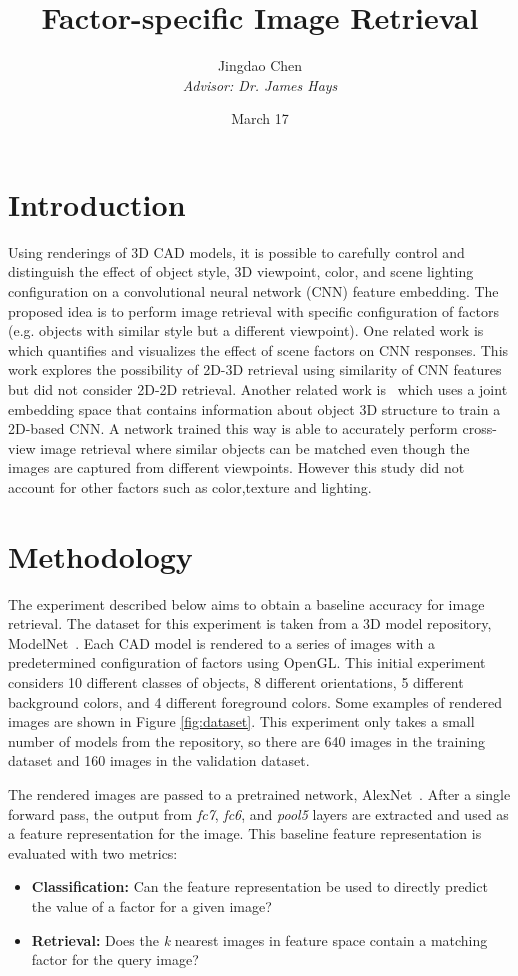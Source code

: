 \documentclass[twoside,10pt]{article}
\begin{document}
\onecolumn
\title{Factor-specific Image Retrieval}
\author{Jingdao Chen \\
	\textit{Advisor: Dr. James Hays}
}
\date{March 17}
\maketitle

\section{Introduction}
Using renderings of 3D CAD models, it is possible to carefully control and distinguish the effect of object style, 
3D viewpoint, color, and scene lighting configuration on a convolutional neural network (CNN) feature embedding.
The proposed idea is to perform image retrieval with specific configuration of factors (e.g. objects with similar style but a different viewpoint).
One related work is~\cite{aubry2015} which quantifies and visualizes the effect of scene factors on CNN responses.
This work explores the possibility of 2D-3D retrieval using similarity of CNN features but did not consider 2D-2D retrieval.
Another related work is~\cite{li2015} which uses a joint embedding space that contains information about object 3D structure to train a 2D-based CNN.
A network trained this way is able to accurately perform cross-view image retrieval where similar objects can be matched even though the images are captured from different viewpoints.
However this study did not account for other factors such as color,texture and lighting.

\section{Methodology}

The experiment described below aims to obtain a baseline accuracy for image retrieval.  
The dataset for this experiment is taken from a 3D model repository, ModelNet~\cite{wu2015}.
Each CAD model is rendered to a series of images with a predetermined configuration of factors using OpenGL.
This initial experiment considers 10 different classes of objects, 8 different orientations, 5 different background colors, and 4 different foreground colors.
Some examples of rendered images are shown in Figure \ref{fig:dataset}. This experiment only takes a small number of models from the repository, so there are
640 images in the training dataset and 160 images in the validation dataset.

The rendered images are passed to a pretrained network, AlexNet~\cite{alex2012}.
After a single forward pass, the output from \textit{fc7}, \textit{fc6}, and \textit{pool5} layers are extracted and used as a feature representation for the image.
This baseline feature representation is evaluated with two metrics:
\begin{itemize}
	\item \textbf{Classification:} Can the feature representation be used to directly predict the value of a factor for a given image?
	\item \textbf{Retrieval:} Does the \textit{k} nearest images in feature space contain a matching factor for the query image?
\end{itemize}
\end{document}
